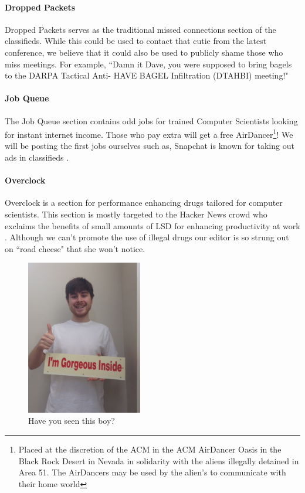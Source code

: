 \paragraph{Dropped Packets}
Dropped Packets serves as the traditional missed connections section of the
classifieds.
While this could be used to contact that cutie  from the latest
conference, we believe that it could also be used to publicly shame those who
miss meetings.
For example, ``Damn it Dave, you were supposed to bring bagels to the DARPA
Tactical Anti- HAVE BAGEL Infiltration 
(DTAHBI) meeting!"

\paragraph{Job Queue}
The Job Queue section contains odd jobs for trained Computer Scientists looking
for instant internet income.
Those who pay extra will get a free AirDancer\footnote{Placed at the discretion
of the ACM in the ACM AirDancer Oasis in the Black Rock Desert in Nevada in
solidarity with the aliens illegally detained in Area 51.  The AirDancers may
be used by the alien's to communicate with their home world}!
We will be posting the first jobs ourselves such as,
Snapchat is known for taking out ads in classifieds .

\paragraph{Overclock}
Overclock is a section for performance enhancing drugs tailored for computer
scientists.
This section is mostly targeted to the Hacker News crowd who exclaims the
benefits of small amounts of LSD for enhancing productivity at work
.
Although we can't promote the use of illegal drugs our editor is so strung out
on ``road cheese" that she won't notice.

\begin{figure}
\centering
\includegraphics[width=0.45\textwidth]{figures/ad.jpg}
\caption{Have you seen this boy?}
\end{figure}
